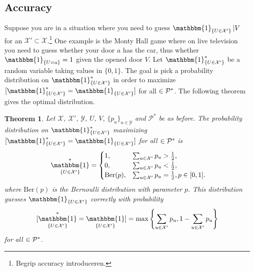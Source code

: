\documentclass[a4paper]{report}
\theoremstyle{plain}
\newtheorem{theorem}{Theorem}[section]
\theoremstyle{definition}
\theoremstyle{remark}
\numberwithin{equation}{chapter}
\let\P\relax
\DeclareMathOperator{\P}{\mathbb{P}}
\DeclareMathOperator{\1}{\mathbbm{1}}
\newcommand{\X}{\mathcal{X}}
\newcommand{\Y}{\mathcal{Y}}
\newcommand{\Pmod}{\mathcal{P}^*}
\newcommand{\GeneralGenInd}{\1_{\{U\in\X'\}}}
\begin{document}
\subsection{Accuracy}
Suppose you are in a situation where you need to guess $\GeneralGenInd|V$ for an $\X'\subset\X$.\footnote{Begrip accuracy introduceren.} One example is the Monty Hall game where on live television you need to guess whether your door $a$ has the car, thus whether $\1_{\{U=a\}}=1$ given the opened door $V$. Let $\GeneralGenInd^*$ be a random variable taking values in $\{0,1\}$. The goal is pick a probability distribution on $\GeneralGenInd^*$ in order to maximize $\P[\GeneralGenInd^*=\GeneralGenInd]$ for all $\P\in\Pmod$. The following theorem gives the optimal distribution.
\begin{theorem}\label{thm:DiscAccOpt}
Let $\X$, $\X'$, $\Y$, $U$, $V$, $\{p_u\}_{u\in\Y}$ and $\Pmod$ be as before. The probability distribution on $\GeneralGenInd^*$ maximizing $\P[\GeneralGenInd^*=\GeneralGenInd]$ for all $\P\in\Pmod$ is
\begin{equation}\
\GeneralGenInd^*=\begin{cases}
1,&\sum_{u\in\X'}p_u>\frac{1}{2},\\
0,&\sum_{u\in\X'}p_u<\frac{1}{2},\\
\mathrm{Ber}(p),&\sum_{u\in\X'}p_u=\frac{1}{2},p\in[0,1].
\end{cases}
\end{equation}
where $\mathrm{Ber}(p)$ is the Bernoulli distribution with parameter $p$. This distribution guesses $\GeneralGenInd$ correctly with probability 
\begin{equation}
\P[\GeneralGenInd^*=\GeneralGenInd]=\max\left\{\sum_{u\in\X'}p_u,1-\sum_{u\in\X'}p_u\right\}
\end{equation}
for all $\P\in\Pmod$.
\end{theorem}
\end{document}
